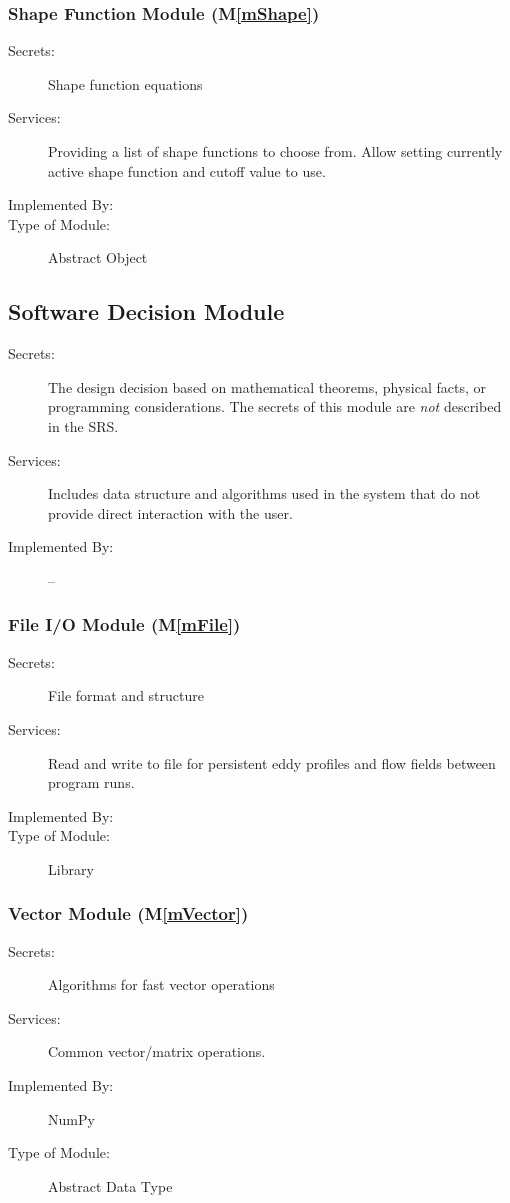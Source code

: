 \documentclass[12pt, titlepage]{article}
\newcommand{\mref}[1]{M\ref{#1}}
\begin{document}
\subsubsection{Shape Function Module (\mref{mShape})}
\begin{description}
\item[Secrets:]Shape function equations
\item[Services:]Providing a list of shape functions to choose from. Allow setting currently active shape function and cutoff value to use.
\item[Implemented By:] \progname{}
\item[Type of Module:] Abstract Object
\end{description}


\subsection{Software Decision Module}

\begin{description}
\item[Secrets:] The design decision based on mathematical theorems, physical
  facts, or programming considerations. The secrets of this module are
  \emph{not} described in the SRS.
\item[Services:] Includes data structure and algorithms used in the system that
  do not provide direct interaction with the user. 
\item[Implemented By:] --
\end{description}

\subsubsection{File I/O Module (\mref{mFile})}
\begin{description}
\item[Secrets:]File format and structure
\item[Services:]Read and write to file for persistent eddy profiles and flow fields between program runs.
\item[Implemented By:] \progname{}
\item[Type of Module:] Library
\end{description}

\subsubsection{Vector Module (\mref{mVector})}
\begin{description}
\item[Secrets:]Algorithms for fast vector operations
\item[Services:]Common vector/matrix operations.
\item[Implemented By:] NumPy
\item[Type of Module:] Abstract Data Type
\end{description}
\end{document}
